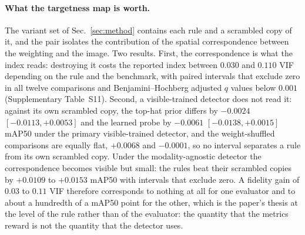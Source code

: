 \documentclass[preprint,10pt]{elsarticle}
\begin{document}
\begin{sloppypar}
\paragraph{What the targetness map is worth.} The variant set of
Sec.~\ref{sec:method} contains each rule and a scrambled copy of it, and the pair
isolates the contribution of the spatial correspondence between the weighting and the
image. Two results. First, the correspondence is what the index reads: destroying it
costs the reported index between $0.030$ and $0.110$ VIF depending on the rule and the
benchmark, with paired intervals that exclude zero in all twelve comparisons and
Benjamini--Hochberg adjusted $q$ values below $0.001$ (Supplementary Table~S11). Second,
a visible-trained detector does not read it: against its own scrambled copy, the
top-hat prior differs by $-0.0024$ $[-0.0113,+0.0053]$ and the learned probe by
$-0.0061$ $[-0.0138,+0.0015]$ mAP50 under the primary visible-trained detector, and the
weight-shuffled comparisons are equally flat, $+0.0068$ and $-0.0001$, so no interval
separates a rule from its own scrambled copy. Under the modality-agnostic detector the
correspondence becomes visible but small: the rules beat their scrambled copies by
$+0.0109$ to $+0.0153$ mAP50 with intervals that exclude zero. A fidelity gain of
$0.03$ to $0.11$ VIF therefore corresponds to nothing at all for one evaluator and to
about a hundredth of a mAP50 point for the other, which is the paper's thesis at the
level of the rule rather than of the evaluator: the quantity that the metrics reward
is not the quantity that the detector uses.


\end{sloppypar}
\end{document}
